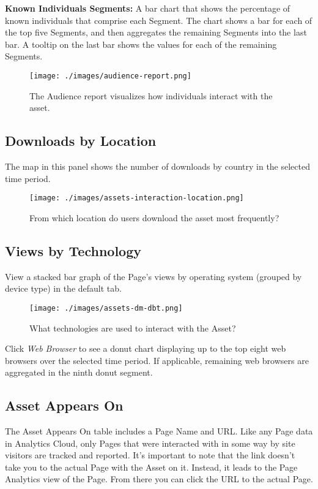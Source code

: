 \textbf{Known Individuals Segments:} A bar chart that shows the
percentage of known individuals that comprise each Segment. The chart
shows a bar for each of the top five Segments, and then aggregates the
remaining Segments into the last bar. A tooltip on the last bar shows
the values for each of the remaining Segments.

\begin{figure}
\centering
\texttt{[image: ./images/audience-report.png]}
\caption{The Audience report visualizes how individuals interact with
the asset.}
\end{figure}

\subsection{Downloads by Location}\label{downloads-by-location}

The map in this panel shows the number of downloads by country in the
selected time period.

\begin{figure}
\centering
\texttt{[image: ./images/assets-interaction-location.png]}
\caption{From which location do users download the asset most
frequently?}
\end{figure}

\subsection{Views by Technology}\label{views-by-technology-2}

View a stacked bar graph of the Page's views by operating system
(grouped by device type) in the default tab.

\begin{figure}
\centering
\texttt{[image: ./images/assets-dm-dbt.png]}
\caption{What technologies are used to interact with the Asset?}
\end{figure}

Click \emph{Web Browser} to see a donut chart displaying up to the top
eight web browsers over the selected time period. If applicable,
remaining web browsers are aggregated in the ninth donut segment.

\subsection{Asset Appears On}\label{asset-appears-on-2}

The Asset Appears On table includes a Page Name and URL. Like any Page
data in Analytics Cloud, only Pages that were interacted with in some
way by site visitors are tracked and reported. It's important to note
that the link doesn't take you to the actual Page with the Asset on it.
Instead, it leads to the Page Analytics view of the Page. From there you
can click the URL to the actual Page.


